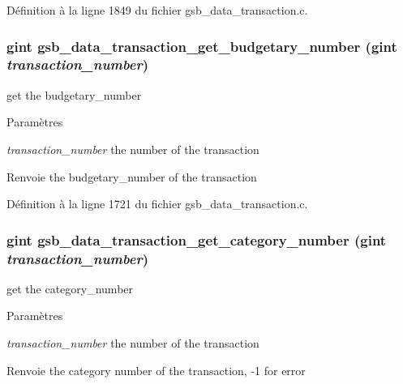 Définition à la ligne 1849 du fichier gsb\_\-data\_\-transaction.c.

\subsubsection[{gsb\_\-data\_\-transaction\_\-get\_\-budgetary\_\-number}]{\setlength{\rightskip}{0pt plus 5cm}gint gsb\_\-data\_\-transaction\_\-get\_\-budgetary\_\-number (gint {\em transaction\_\-number})}\label{gsb__data__transaction_8c_a4d84c55dbdfa032c500f4ade0754501f}
get the budgetary\_\-number 
\begin{DoxyParams}{Paramètres}
\item[{\em transaction\_\-number}]the number of the transaction \end{DoxyParams}
\begin{DoxyReturn}{Renvoie}
the budgetary\_\-number of the transaction 
\end{DoxyReturn}


Définition à la ligne 1721 du fichier gsb\_\-data\_\-transaction.c.

\subsubsection[{gsb\_\-data\_\-transaction\_\-get\_\-category\_\-number}]{\setlength{\rightskip}{0pt plus 5cm}gint gsb\_\-data\_\-transaction\_\-get\_\-category\_\-number (gint {\em transaction\_\-number})}\label{gsb__data__transaction_8c_a5cdaf5e8911118bf8d1dbdfc42dc4761}
get the category\_\-number


\begin{DoxyParams}{Paramètres}
\item[{\em transaction\_\-number}]the number of the transaction\end{DoxyParams}
\begin{DoxyReturn}{Renvoie}
the category number of the transaction, -\/1 for error 
\end{DoxyReturn}


